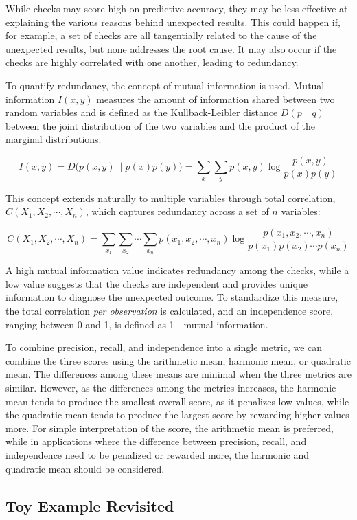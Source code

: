 \documentclass[
  12pt,
]{interact}
\begin{document}
While checks may score high on predictive accuracy, they may be less
effective at explaining the various reasons behind unexpected results.
This could happen if, for example, a set of checks are all tangentially
related to the cause of the unexpected results, but none addresses the
root cause. It may also occur if the checks are highly correlated with
one another, leading to redundancy.

To quantify redundancy, the concept of mutual information is used.
Mutual information \(I(x, y)\) measures the amount of information shared
between two random variables and is defined as the Kullback-Leibler
distance \(D(p \parallel q)\) between the joint distribution of the two
variables and the product of the marginal distributions:

\[I(x,y) = D\big(p(x,y) \parallel p(x)p(y)\big) = \sum_x \sum_y p(x,y) \log \frac{p(x,y)}{p(x)p(y)}\]

This concept extends naturally to multiple variables through total
correlation, \(C(X_1, X_2, \cdots, X_n)\), which captures redundancy
across a set of \(n\) variables:

\[C(X_1, X_2, \cdots, X_n) = \sum_{x_1} \sum_{x_2} \cdots \sum_{x_n} p(x_1, x_2, \cdots, x_n) \log \frac{p(x_1, x_2, \cdots, x_n)}{p(x_1)p(x_2) \cdots p(x_n)}\]

A high mutual information value indicates redundancy among the checks,
while a low value suggests that the checks are independent and provides
unique information to diagnose the unexpected outcome. To standardize
this measure, the total correlation \emph{per observation} is
calculated, and an independence score, ranging between 0 and 1, is
defined as 1 - mutual information.

To combine precision, recall, and independence into a single metric, we
can combine the three scores using the arithmetic mean, harmonic mean,
or quadratic mean. The differences among these means are minimal when
the three metrics are similar. However, as the differences among the
metrics increases, the harmonic mean tends to produce the smallest
overall score, as it penalizes low values, while the quadratic mean
tends to produce the largest score by rewarding higher values more. For
simple interpretation of the score, the arithmetic mean is preferred,
while in applications where the difference between precision, recall,
and independence need to be penalized or rewarded more, the harmonic and
quadratic mean should be considered.

\subsection{Toy Example Revisited}\label{toy-example-revisited}
\end{document}
